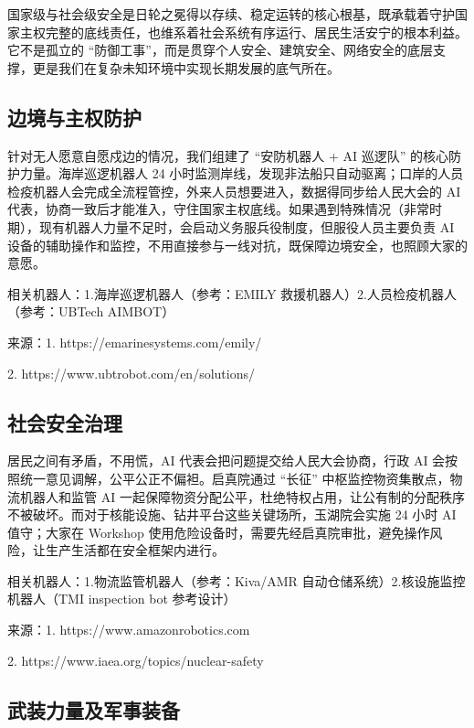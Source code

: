 国家级与社会级安全是日轮之冕得以存续、稳定运转的核心根基，既承载着守护国家主权完整的底线责任，也维系着社会系统有序运行、居民生活安宁的根本利益。它不是孤立的 ``防御工事''，而是贯穿个人安全、建筑安全、网络安全的底层支撑，更是我们在复杂未知环境中实现长期发展的底气所在。

\subsection{边境与主权防护}\label{ux8fb9ux5883ux4e0eux4e3bux6743ux9632ux62a4}

针对无人愿意自愿戍边的情况，我们组建了 ``安防机器人 + AI 巡逻队'' 的核心防护力量。海岸巡逻机器人 24 小时监测岸线，发现非法船只自动驱离；口岸的人员检疫机器人会完成全流程管控，外来人员想要进入，数据得同步给人民大会的 AI 代表，协商一致后才能准入，守住国家主权底线。如果遇到特殊情况（非常时期），现有机器人力量不足时，会启动义务服兵役制度，但服役人员主要负责 AI 设备的辅助操作和监控，不用直接参与一线对抗，既保障边境安全，也照顾大家的意愿。

相关机器人：1.海岸巡逻机器人（参考：EMILY 救援机器人）2.人员检疫机器人（参考：UBTech AIMBOT）

来源：1.
https://emarinesystems.com/emily/

 2.
https://www.ubtrobot.com/en/solutions/

\subsection{社会安全治理}\label{ux793eux4f1aux5b89ux5168ux6cbbux7406}

居民之间有矛盾，不用慌，AI 代表会把问题提交给人民大会协商，行政 AI 会按照统一意见调解，公平公正不偏袒。启真院通过 ``长征'' 中枢监控物资集散点，物流机器人和监管 AI 一起保障物资分配公平，杜绝特权占用，让公有制的分配秩序不被破坏。而对于核能设施、钻井平台这些关键场所，玉湖院会实施 24 小时 AI 值守；大家在 Workshop 使用危险设备时，需要先经启真院审批，避免操作风险，让生产生活都在安全框架内进行。

相关机器人：1.物流监管机器人（参考：Kiva/AMR 自动仓储系统）2.核设施监控机器人（TMI inspection bot 参考设计）

来源：1.
https://www.amazonrobotics.com

 2.
https://www.iaea.org/topics/nuclear-safety

\subsection{武装力量及军事装备}\label{ux6b66ux88c5ux529bux91cfux53caux519bux4e8bux88c5ux5907}

